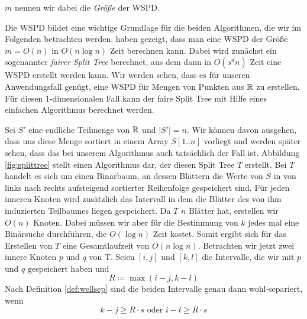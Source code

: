 	\noindent $m$ nennen wir dabei die \emph{Größe} der WSPD.

	Die WSPD bildet eine wichtige Grundlage für die beiden Algorithmen, die wir im Folgenden betrachten werden. 
	\textellipsis haben gezeigt, dass man eine WSPD der Größe $m = O(n)$ in $O(n\log n)$ Zeit berechnen kann. 
	Dabei wird zunächst ein sogenannter \emph{fairer Split Tree} berechnet, aus dem dann in $O(s^dn)$ Zeit eine WSPD erstellt werden kann. 
	Wir werden sehen, dass es für unseren Anwendungsfall genügt, eine WSPD für Mengen von Punkten aus $\mathbb{R}$ zu erstellen. 
	Für diesen 1-dimensionalen Fall kann der faire Split Tree mit Hilfe eines einfachen Algorithmus berechnet werden.
	
	
	
	Sei $S'$ eine endliche Teilmenge von $\mathbb{R}$ und $|S'| = n$. Wir können davon ausgehen, dass uns diese Menge sortiert in einem Array $S[1..n]$ vorliegt und werden später sehen, dass das bei unserem Algorithmus auch tatsächlich der Fall ist. Abbildung \ref{fig:splittree} stellt einen Algorithmus dar, der diesen Split Tree $T$ erstellt. Bei $T$ handelt es sich um einen Binärbaum, an dessen Blättern die Werte von $S$ in von links nach rechts aufsteigend sortierter Reihenfolge gespeichert sind. Für jeden inneren Knoten wird zusätzlich das Intervall in dem die Blätter des von ihm induzierten Teilbaumes liegen gespeichert.
	Da $T$ $n$ Blätter hat, erstellen wir $O(n)$ Knoten. Dabei müssen wir aber für die Bestimmung von $k$ jedes mal eine Binärsuche durchführen, die $O(\log n)$ Zeit kostet. Somit ergibt sich für das Erstellen von $T$ eine Gesamtlaufzeit von $O(n\log n)$.
	Betrachten wir jetzt zwei innere Knoten $p$ und $q$ von T. Seien $[i, j]$ und $[k, l]$ die Intervalle, die wir mit $p$ und $q$ gespeichert haben und 
	\[R \coloneqq \max(i - j, k - l)\]
	Nach Definition \ref{def:wellsep} sind die beiden Intervalle genau dann wohl-separiert, wenn 
	\[k - j \geq R \cdot s \text{ oder } i - l \geq R \cdot s \]
	
	
	
